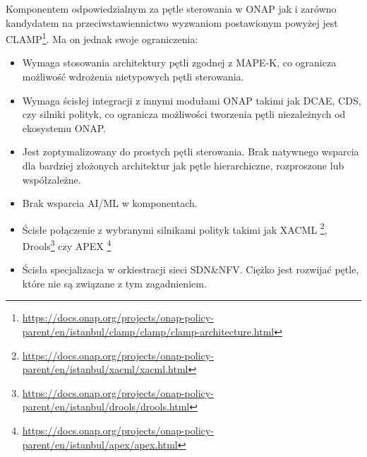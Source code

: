 Komponentem odpowiedzialnym za pętle sterowania w ONAP jak i zarówno kandydatem na przeciwstawiennictwo wyzwaniom postawionym powyżej jest CLAMP\footnote{\url{https://docs.onap.org/projects/onap-policy-parent/en/istanbul/clamp/clamp/clamp-architecture.html}}. Ma on jednak swoje ograniczenia:
\begin{itemize}
    \item Wymaga stosowania architektury pętli zgodnej z MAPE-K, co ogranicza możliwość wdrożenia nietypowych pętli sterowania.
    \item Wymaga ścisłej integracji z innymi modułami ONAP takimi jak DCAE, CDS, czy silniki polityk, co ogranicza możliwości tworzenia pętli niezależnych od ekosystemu ONAP.
    \item Jest zoptymalizowany do prostych pętli sterowania. Brak natywnego wsparcia dla bardziej złożonych architektur jak pętle hierarchiczne, rozproszone lub współzależne.
    \item Brak wsparcia AI/ML w komponentach.
    \item Ścisłe połączenie z wybranymi silnikami polityk takimi jak XACML \footnote{\url{https://docs.onap.org/projects/onap-policy-parent/en/istanbul/xacml/xacml.html}}, Drools\footnote{\url{https://docs.onap.org/projects/onap-policy-parent/en/istanbul/drools/drools.html}} czy APEX \footnote{\url{https://docs.onap.org/projects/onap-policy-parent/en/istanbul/apex/apex.html}} 
    \item Ścisła specjalizacja w orkiestracji sieci SDN\&NFV. Ciężko jest rozwijać pętle, które nie są związane z tym zagadnieniem.
\end{itemize}




